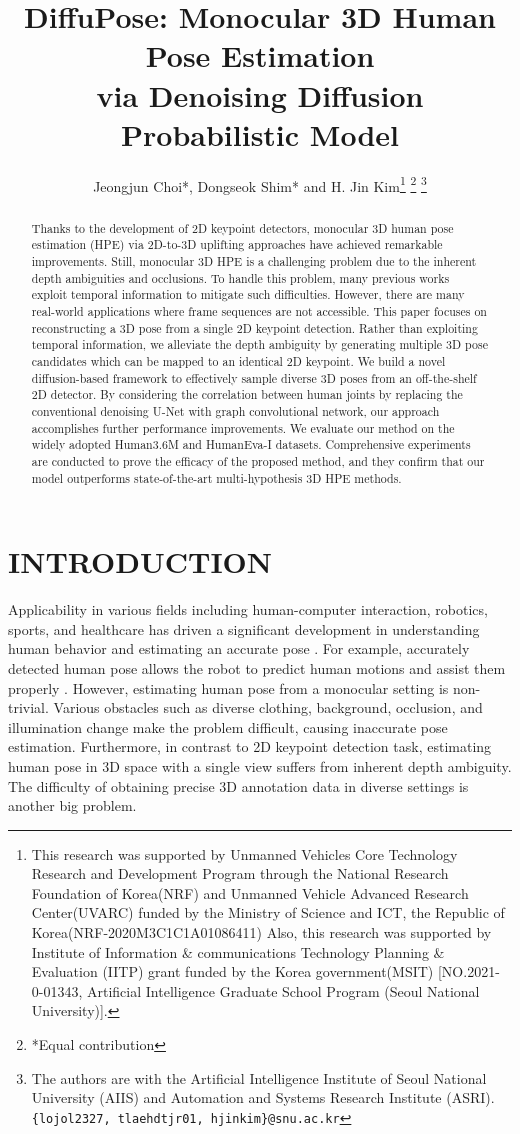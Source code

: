 \documentclass[letterpaper, 10 pt, conference]{ieeeconf}
\title{\LARGE \bf
DiffuPose: Monocular 3D Human Pose Estimation\\via Denoising Diffusion Probabilistic Model  
}
\author{Jeongjun Choi*, Dongseok Shim* and H. Jin Kim\thanks{This research was supported by Unmanned Vehicles Core Technology Research and Development Program through the National Research  Foundation of Korea(NRF) and Unmanned Vehicle Advanced Research Center(UVARC) funded by the Ministry of Science and ICT, the Republic of Korea(NRF-2020M3C1C1A01086411) Also, this research was supported by Institute of Information \&
communications Technology Planning \& Evaluation (IITP)
grant funded by the Korea government(MSIT) [NO.2021-
0-01343, Artificial Intelligence Graduate School Program
(Seoul National University)].}
\thanks{*Equal contribution}
\thanks{The authors are with the Artificial Intelligence Institute of Seoul National University (AIIS) and Automation and Systems Research Institute (ASRI). 
        {\tt\small \{lojol2327, tlaehdtjr01, hjinkim\}@snu.ac.kr}}}
\begin{document}
\maketitle
\thispagestyle{empty}
\pagestyle{empty}


\begin{abstract}

 Thanks to the development of 2D keypoint detectors, monocular 3D human pose estimation (HPE) via 2D-to-3D uplifting approaches have achieved remarkable improvements.
    Still, monocular 3D HPE is a challenging problem due to the inherent depth ambiguities and occlusions.
    To handle this problem, many previous works exploit temporal information to mitigate such difficulties.
    However, there are many real-world applications where frame sequences are not accessible. 
    This paper focuses on reconstructing a 3D pose from a single 2D keypoint detection.
    Rather than exploiting temporal information, we alleviate the depth ambiguity by generating multiple 3D pose candidates which can be mapped to an identical 2D keypoint.
    We build a novel diffusion-based framework to effectively sample diverse 3D poses from an off-the-shelf 2D detector.
    By considering the correlation between human joints by replacing the conventional denoising U-Net with graph convolutional network, our approach accomplishes further performance improvements.
    We evaluate our method on the widely adopted Human3.6M and HumanEva-I datasets.
    Comprehensive experiments are conducted to prove the efficacy of the proposed method, and they confirm that our model outperforms state-of-the-art multi-hypothesis 3D HPE methods.

\end{abstract}
\section{INTRODUCTION}

Applicability in various fields including human-computer interaction, robotics, sports, and healthcare has driven a significant development in understanding human behavior and estimating an accurate pose \cite{clever20183d, martinez2020residual, zimmermann20183d, reily2020simultaneous}.
For example, accurately detected human pose allows the robot to predict human motions and assist them properly \cite{gui2018teaching, erickson2022characterizing}.
However, estimating human pose from a monocular setting is non-trivial.
Various obstacles such as diverse clothing, background, occlusion, and illumination change make the problem difficult, causing inaccurate pose estimation.
Furthermore, in contrast to 2D keypoint detection task, estimating human pose in 3D space with a single view suffers from inherent depth ambiguity.
The difficulty of obtaining precise 3D annotation data in diverse settings is another big problem.
\end{document}
